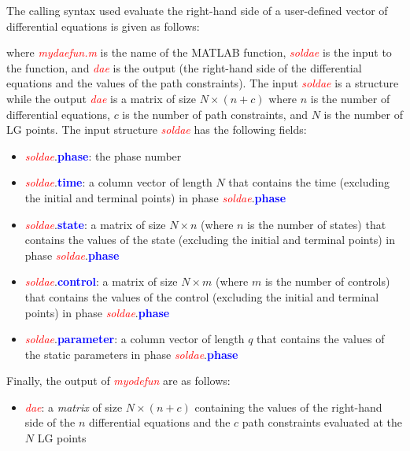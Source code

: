 \documentclass[10pt,final]{report}
\newcommand{\bfblue}[1]{\textcolor{blue}{\bf #1}}
\newcommand{\slred}[1]{\textcolor{red}{\sl #1}}
\begin{document}
The calling syntax used evaluate the right-hand side of a user-defined vector
of differential equations is given as follows:
\begin{center}
\end{center}
{\noindent}where \slred{mydaefun.m} is the name of the MATLAB function,
\slred{soldae} is the input to the function, and
\slred{dae} is the output (\ie the right-hand side of the
differential equations and the values of the path constraints).  The
input \slred{soldae} is a structure while the output \slred{dae} is a
matrix of size $N \times (n+c)$ where $n$ is the number of
differential equations, $c$ is the number of path constraints, and $N$
is the number of LG points.  The input structure \slred{soldae} has
the following fields:
\begin{itemize}
  \item \slred{soldae}.\bfblue{phase}:  the phase number
  \item \slred{soldae}.\bfblue{time}:  a column vector of length $N$ that
    contains the time (excluding the initial and terminal points) in phase \slred{soldae}.\bfblue{phase}
  \item \slred{soldae}.\bfblue{state}:  a matrix of size $N\times n$ (where $n$
    is the number of states) that contains the values of the state (excluding the initial and
    terminal points) in phase \slred{soldae}.\bfblue{phase}
  \item \slred{soldae}.\bfblue{control}:  a matrix of size $N\times m$ (where $m$
    is the number of controls) that contains the values of the control (excluding the initial and
    terminal points) in phase \slred{soldae}.\bfblue{phase}
  \item \slred{soldae}.\bfblue{parameter}:  a column vector of length $q$ that
    contains the values of the static parameters in phase \slred{soldae}.\bfblue{phase}
\end{itemize}
Finally, the output of \slred{myodefun} are as follows:
\begin{itemize}
  \item \slred{dae}: a {\em matrix} of size $N\times (n+c)$ containing
    the values of the right-hand side of the $n$ differential
    equations and the $c$ path constraints evaluated at the $N$ LG points
\end{itemize}
\end{document}
